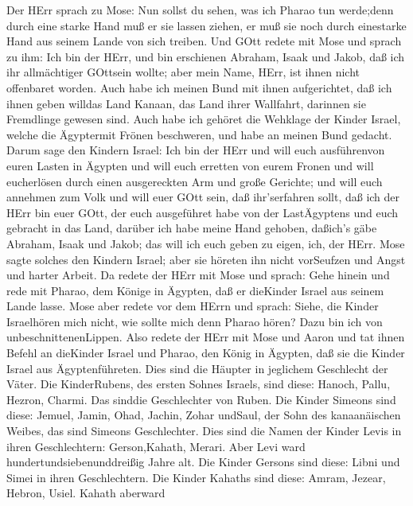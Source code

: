  Der HErr sprach zu Mose: Nun sollst du sehen, was ich
Pharao tun werde;denn durch eine starke Hand muß er sie lassen ziehen,
er muß sie noch durch einestarke Hand aus seinem Lande von sich treiben.
 Und GOtt redete mit Mose und sprach zu ihm: Ich bin der
HErr,  und bin erschienen Abraham, Isaak und Jakob, daß ich
ihr allmächtiger GOttsein wollte; aber mein Name, HErr, ist ihnen nicht
offenbaret worden.  Auch habe ich meinen Bund mit ihnen
aufgerichtet, daß ich ihnen geben willdas Land Kanaan, das Land ihrer
Wallfahrt, darinnen sie Fremdlinge gewesen sind.  Auch habe
ich gehöret die Wehklage der Kinder Israel, welche die Ägyptermit Frönen
beschweren, und habe an meinen Bund gedacht.  Darum sage den
Kindern Israel: Ich bin der HErr und will euch ausführenvon euren Lasten
in Ägypten und will euch erretten von eurem Fronen und will eucherlösen
durch einen ausgereckten Arm und große Gerichte;  und will
euch annehmen zum Volk und will euer GOtt sein, daß ihr'serfahren sollt,
daß ich der HErr bin euer GOtt, der euch ausgeführet habe von der
LastÄgyptens  und euch gebracht in das Land, darüber ich
habe meine Hand gehoben, daßich's gäbe Abraham, Isaak und Jakob; das
will ich euch geben zu eigen, ich, der HErr.  Mose sagte
solches den Kindern Israel; aber sie höreten ihn nicht vorSeufzen und
Angst und harter Arbeit.  Da redete der HErr mit Mose und
sprach:  Gehe hinein und rede mit Pharao, dem Könige in
Ägypten, daß er dieKinder Israel aus seinem Lande lasse. 
Mose aber redete vor dem HErrn und sprach: Siehe, die Kinder Israelhören
mich nicht, wie sollte mich denn Pharao hören? Dazu bin ich von
unbeschnittenenLippen.  Also redete der HErr mit Mose und
Aaron und tat ihnen Befehl an dieKinder Israel und Pharao, den König in
Ägypten, daß sie die Kinder Israel aus Ägyptenführeten. 
Dies sind die Häupter in jeglichem Geschlecht der Väter. Die
KinderRubens, des ersten Sohnes Israels, sind diese: Hanoch, Pallu,
Hezron, Charmi. Das sinddie Geschlechter von Ruben.  Die
Kinder Simeons sind diese: Jemuel, Jamin, Ohad, Jachin, Zohar undSaul,
der Sohn des kanaanäischen Weibes, das sind Simeons Geschlechter.
 Dies sind die Namen der Kinder Levis in ihren
Geschlechtern: Gerson,Kahath, Merari. Aber Levi ward
hundertundsiebenunddreißig Jahre alt.  Die Kinder Gersons
sind diese: Libni und Simei in ihren Geschlechtern.  Die
Kinder Kahaths sind diese: Amram, Jezear, Hebron, Usiel. Kahath aberward
